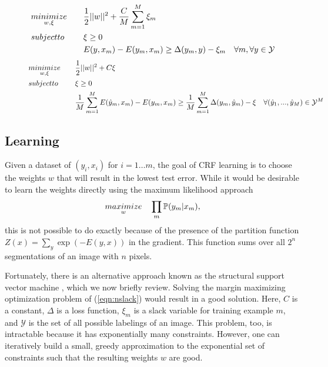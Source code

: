 \documentclass[journal]{IEEEtran}
\begin{document}
\begin{figure*}
  \normalsize
  \hrulefill
  
  \begin{equation}
    \begin{aligned}
      & \minimize{w, \xi} & & \frac{1}{2} ||w||^2 + \frac{C}{M} \sum_{m=1}^M \xi_m \label{eqn:nslack} \\
      & \st & & \xi \geq 0 \\
      & & & E ( y, x_m ) - E ( y_m, x_m ) \geq \Delta (y_m, y) - \xi_m \quad \forall m, \forall y \in \mathcal{Y} \\
    \end{aligned}
  \end{equation}
  \vspace{0.2in}
  \begin{equation}
    \begin{aligned}
      & \minimize{w, \xi} & & \frac{1}{2} ||w||^2 + C\xi \label{eqn:oneslack} \\
      & \st & & \xi \geq 0 \\
      & & & \frac{1}{M} \sum_{m=1}^M E ( \hat{y}_m, x_m )
      - E ( y_m, x_m ) \geq \frac{1}{M} \sum_{m=1}^M \Delta(y_m, \hat{y}_m) - \xi \quad \forall (\hat{y}_1, ..., \hat{y}_M) \in \mathcal{Y}^M
    \end{aligned}
  \end{equation}

  \hrulefill
  \vspace*{4pt}
\end{figure*}


\subsection{Learning}
\label{sec:learning}

Given a dataset of $(y_i, x_i)$ for $i=1 \dots m$, the goal of CRF learning is to choose the weights $w$ that will result in the lowest test error. While it would be desirable to learn the weights directly using the maximum likelihood approach
\begin{align}
  \underset{w}{\relax{maximize}}\quad \prod_m \mathbb{P}(y_m | x_m),
\end{align}
this is not possible to do exactly because of the presence of the partition function $Z(x) = \sum_{y} \exp(-E(y, x))$ in the gradient.  This function sums over all $2^n$ segmentations of an image with $n$ pixels.

Fortunately, there is an alternative approach known as the structural support vector machine \cite{taskar2005a, tsochantaridis2005a, szummer2008a}, which we now briefly review.  Solving the margin maximizing optimization problem of (\ref{eqn:nslack}) would result in a good solution. Here, $C$ is a constant, $\Delta$ is a loss function, $\xi_m$ is a slack variable for training example $m$, and $\mathcal{Y}$ is the set of all possible labelings of an image. This problem, too, is intractable because it has exponentially many constraints.  However, one can iteratively build a small, greedy approximation to the exponential set of constraints such that the resulting weights $w$ are good.
\end{document}
